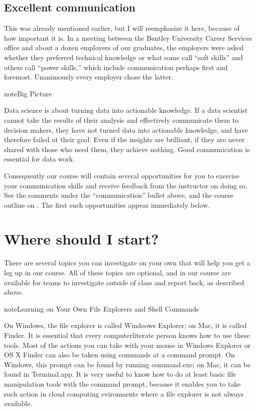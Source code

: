 \documentclass[letterpaper,10pt,english]{sphinxmanual}
\begin{document}
\subsection{Excellent communication}
\label{\detokenize{chapter-1-intro-to-data-science:excellent-communication}}
This was already mentioned earlier, but I will re\sphinxhyphen{}emphasize it here, because of how important it is.  In a meeting between the Bentley University Career Services office and about a dozen employers of our graduates, the employers were asked whether they preferred technical knowledge or what some call “soft skills” and others call “power skills,” which include communication perhaps first and foremost.  Unanimously every employer chose the latter.

\begin{sphinxadmonition}{note}{Big Picture}

Data science is about turning data into actionable knowledge.  If a data scientist cannot take the results of their analysis and effectively communicate them to decision makers, they have not turned data into actionable knowledge, and have therefore failed at their goal.  Even if the insights are brilliant, if they are never shared with those who need them, they achieve nothing.  Good communication is essential for data work.
\end{sphinxadmonition}

Consequently our course will contain several opportunities for you to exercise your communication skills and receive feedback from the instructor on doing so.  See the comments under the “communication” bullet above, and the course outline on {\hyperref[\detokenize{intro::doc}]{}}.  The first such opportunities appear immediately below.


\section{Where should I start?}
\label{\detokenize{chapter-1-intro-to-data-science:where-should-i-start}}
There are several topics you can investigate on your own that will help you get a leg up in our course.  All of these topics are optional, and in our course are available for teams to investigate outside of class and report back, as described above.

\begin{sphinxadmonition}{note}{Learning on Your Own \sphinxhyphen{} File Explorers and Shell Commands}

On Windows, the file explorer is called Windoows Explorer; on Mac, it is called Finder.  It is essential that every computer\sphinxhyphen{}literate person knows how to use these tools.  Most of the actions you can take with your mouse in Windows Explorer or OS X Finder can also be taken using commands at a command prompt.  On Windows, this prompt can be found by running command.exe; on Mac, it can be found in Terminal.app.  It is very useful to know how to do at least basic file manipulation tools with the command prompt, because it enables you to take such action in cloud computing evironments where a file explorer is not always available.
\end{sphinxadmonition}
\end{document}
